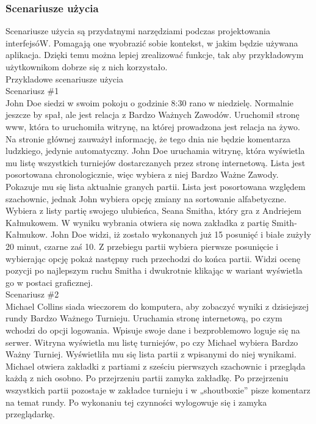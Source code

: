 \documentclass[12pt,leqno]{article}
\begin{document}
\subsubsection{Scenariusze użycia}
Scenariusze użycia są przydatnymi narzędziami podczas projektowania interfejsóW. Pomagają one wyobrazić sobie kontekst, w jakim będzie używana aplikacja. Dzięki temu można lepiej zrealizować funkcje, tak aby przykładowym użytkownikom dobrze się z nich korzystało.\\
Przykladowe scenariusze użycia\\

{\Large Scenariusz \#1}\\
	John Doe siedzi w swoim pokoju o godzinie 8:30 rano w niedzielę. Normalnie jeszcze by spał, ale jest relacja z Bardzo Ważnych Zawodów. Uruchomił stronę www, która to uruchomiła witrynę, na której prowadzona jest relacja na żywo. Na stronie głównej zauważył informację, że tego dnia nie będzie komentarza ludzkiego, jedynie automatyczny. John Doe uruchamia witrynę, która wyświetla mu listę wszystkich turniejów dostarczanych przez stronę internetową. Lista jest posortowana chronologicznie, więc wybiera z niej Bardzo Ważne Zawody. Pokazuje mu się lista aktualnie granych partii. Lista jest posortowana względem szachownic, jednak John wybiera opcję zmiany na sortowanie alfabetyczne. Wybiera z listy partię swojego ulubieńca, Seana Smitha, który gra z Andriejem Kałmukowem. W wyniku wybrania otwiera się nowa zakładka z partię Smith-Kałmukow. John Doe widzi, iż zostało wykonanych już 15 posunięć i białe zużyły 20 minut, czarne zaś 10. Z przebiegu partii wybiera pierwsze posunięcie i wybierając opcję pokaż następny ruch przechodzi do końca partii. Widzi ocenę pozycji po najlepszym ruchu Smitha i dwukrotnie klikając w wariant wyświetla go w postaci graficznej.
\\

{\Large Scenariusz \#2}\\
	Michael Collins siada wieczorem do komputera, aby zobaczyć wyniki z dzisiejszej rundy Bardzo Ważnego Turnieju. Uruchamia stronę internetową, po czym wchodzi do opcji logowania. Wpisuje swoje dane i bezproblemowo loguje się na serwer. Witryna wyświetla mu listę turniejów, po czy Michael wybiera Bardzo Ważny Turniej. Wyświetliła mu się lista partii z wpisanymi do niej wynikami. Michael otwiera zakładki z partiami z sześciu pierwszych szachownic i przegląda każdą z nich osobno. Po przejrzeniu partii zamyka zakładkę. Po przejrzeniu wszystkich partii pozostaje w zakładce turnieju i w „shoutboxie” pisze komentarz na temat rundy.  Po wykonaniu tej czynności wylogowuje się i zamyka przeglądarkę. 
\\
\end{document}
